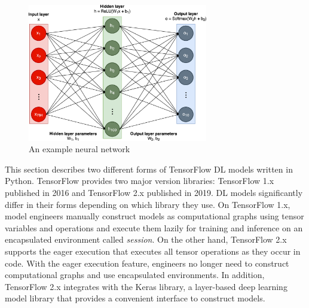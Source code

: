 \begin{figure}\centering
    \centering
    \includegraphics[width=0.7\textwidth]{Fig1.eps}
    \caption{An example neural network}
    \label{fig:back:model}
\end{figure}


This section describes two different forms of TensorFlow DL models written in
Python.
TensorFlow provides two major version libraries: TensorFlow 1.x published in
2016 and TensorFlow 2.x published in 2019. 
DL models significantly differ in their forms depending on which library
they use. 
On TensorFlow 1.x, model engineers manually construct models as computational
graphs using tensor variables and operations and execute them lazily  for
training and inference on an encapsulated environment
called {\it session}.
On the other hand, TensorFlow 2.x supports the eager execution that executes
all tensor operations as they occur in code. 
With the eager execution feature, engineers no longer need to construct
computational graphs and use encapsulated environments.
In addition, TensorFlow 2.x integrates with the Keras library, a layer-based
deep learning model library that provides a convenient interface to construct
models.

